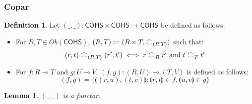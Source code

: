 \documentclass[11pt, oneside]{article}
\theoremstyle{plain}
\newtheorem{lemma}[theorem]{Lemma}
\theoremstyle{definition}
\newtheorem{definition}[theorem]{Definition}
\newcommand{\lp}{\llparenthesis}
\newcommand{\rp}{\rrparenthesis}
\newcommand{\cohs}{{\mathsf{COHS}}}
\newcommand{\coh}[1][]{\mathrel{\vcenter{\offinterlineskip\hbox{$\frown$}\vskip0.2ex\hbox{$\smile$}}_{\ifx\\#1\\\else#1\fi}}}
\begin{document}
\subsubsection{Copar}
\begin{definition}
    Let $(\_,\_):\cohs\times\cohs\to\cohs$ be defined as follows:
    \begin{itemize}
        \item
        For $R,T\in Ob(\cohs)$, $(R,T) \coloneqq (R\times T,\coh[(R,T)])$ such that:
        $$(r,t)\coh[(R,T)](r',t')\iff r\coh[R]r'\text{ and }t\coh[T]t'$$

        \item
        For $f:R\multimap T$ and $g:U\multimap V$, 
        $(f,g):(R,U)\multimap(T,V)$ is defined as follows:
        $$(f,g)=\{\lp(r,u),(t,v)\rp:\lp r,t\rp\in f,\lp u,v\rp\in g\}$$
    \end{itemize}
\end{definition}

\begin{lemma}\label{lem:CoparIsFunctor}
    $(\_,\_)$ is a functor.
\end{lemma}
\end{document}
